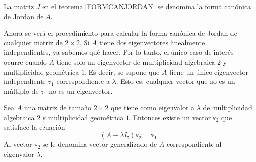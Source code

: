 \begin{definition}
    La matriz $J$ en el teorema \ref{FORMCANJORDAN} se denomina la forma canónica de Jordan de $A$.
\end{definition}

Ahora se verá el procedimiento para calcular la forma canónica de Jordan de cualquier matriz de $2 \times 2$. Si $A$ tiene dos eigenvectores linealmente independientes, ya sabemos qué hacer. Por lo tanto, el único caso de interés ocurre cuando $A$ tiene solo un eigenvector de multiplicidad algebraica $2$ y multiplicidad geométrica $1$. Es decir, se supone que $A$ tiene un único eigenvector independiente $\mathbb{v}_1$ correspondiente a $\lambda$. Esto es, cualquier vector que no es un múltiplo de $\mathbb{v}_1$ no es un eigenvector.

\begin{theorem}
    Sea $A$ una matriz de tamaño $2 \times 2$ que tiene como eigenvalor a $\lambda$ de multiplicidad algebraica $2$ y multiplicidad geométrica $1$. Entonces existe un vector $\mathbb{v}_2$ que satisface la ecuación
    $$(A - \lambda I_2)\mathbb{v}_2 = \mathbb{v}_1$$
    Al vector $\mathbb{v}_2$ se le denomina vector generalizado de $A$ correspondiente al eigenvalor $\lambda$.
\end{theorem}

